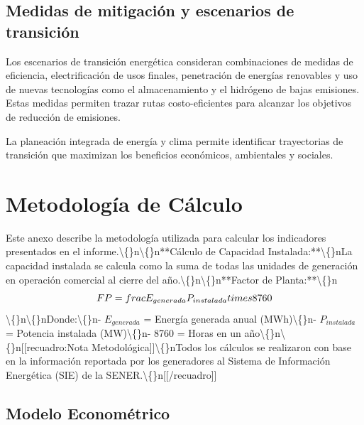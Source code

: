 \documentclass{sener2025}
\begin{document}
\subsection{Medidas de mitigación y escenarios de transición}

Los escenarios de transición energética consideran combinaciones de medidas de eficiencia, electrificación de usos finales, penetración de energías renovables y uso de nuevas tecnologías como el almacenamiento y el hidrógeno de bajas emisiones. Estas medidas permiten trazar rutas costo-eficientes para alcanzar los objetivos de reducción de emisiones.\begin{destacado}
 La planeación integrada de energía y clima permite identificar trayectorias de transición que maximizan los beneficios económicos, ambientales y sociales.
\end{destacado}


\anexos

\section{Metodología de Cálculo}

Este anexo describe la metodología utilizada para calcular los indicadores presentados en el informe.\textbackslash\{\}n\textbackslash\{\}n**Cálculo de Capacidad Instalada:**\textbackslash\{\}nLa capacidad instalada se calcula como la suma de todas las unidades de generación en operación comercial al cierre del año.\textbackslash\{\}n\textbackslash\{\}n**Factor de Planta:**\textbackslash\{\}n\begin{equation}
FP = \\frac{E_{generada}}{P_{instalada} \\times 8760}
\end{equation}\textbackslash\{\}n\textbackslash\{\}nDonde:\textbackslash\{\}n- $E_{generada}$ = Energía generada anual (MWh)\textbackslash\{\}n- $P_{instalada}$ = Potencia instalada (MW)\textbackslash\{\}n- 8760 = Horas en un año\textbackslash\{\}n\textbackslash\{\}n[[recuadro:Nota Metodológica]]\textbackslash\{\}nTodos los cálculos se realizaron con base en la información reportada por los generadores al Sistema de Información Energética (SIE) de la SENER.\textbackslash\{\}n[[/recuadro]]


\subsection{Modelo Econométrico}
\end{document}
